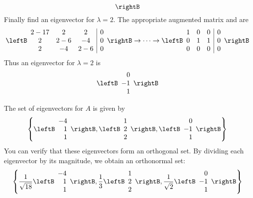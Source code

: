 \begin{solution}
\begin{equation*}
\rightB
\end{equation*}
Finally find an eigenvector for $\lambda =2.$ The appropriate augmented
matrix and {\rref} are 
\begin{equation*}
\leftB
\begin{array}{ccc|c}
2-17 & 2 & 2 & 0 \\ 
2 & 2-6 & -4 & 0 \\ 
2 & -4 & 2-6 & 0
\end{array}
\rightB
\rightarrow \cdots \rightarrow
\leftB
\begin{array}{rrr|r}
1 & 0 & 0 & 0 \\ 
0 & 1 & 1 & 0 \\ 
0 & 0 & 0 & 0
\end{array}
\rightB
\end{equation*}
Thus an eigenvector for $\lambda =2$ is 
\begin{equation*}
\leftB
\begin{array}{r}
0 \\ 
-1 \\ 
1
\end{array}
\rightB
\end{equation*}

The set of eigenvectors for $A$ is given by 
\[
\left\{
\leftB
\begin{array}{r}
-4 \\ 
1 \\ 
1
\end{array}
\rightB,
\leftB
\begin{array}{r}
1 \\ 
2 \\ 
2
\end{array}
\rightB,
\leftB
\begin{array}{r}
0 \\ 
-1 \\ 
1
\end{array}
\rightB
\right\}
\]
You can verify that these eigenvectors form an orthogonal set. By dividing each eigenvector by its magnitude, we obtain an orthonormal set: 
\begin{equation*}
\left\{ \frac{1}{\sqrt{18}}\leftB
\begin{array}{r}
-4 \\ 
1 \\ 
1
\end{array}
\rightB ,\frac{1}{3}\leftB 
\begin{array}{r}
1 \\ 
2 \\ 
2
\end{array}
\rightB ,\frac{1}{\sqrt{2}}\leftB 
\begin{array}{r}
0 \\ 
-1 \\ 
1
\end{array}
\rightB \right\}
\end{equation*}
\end{solution}

